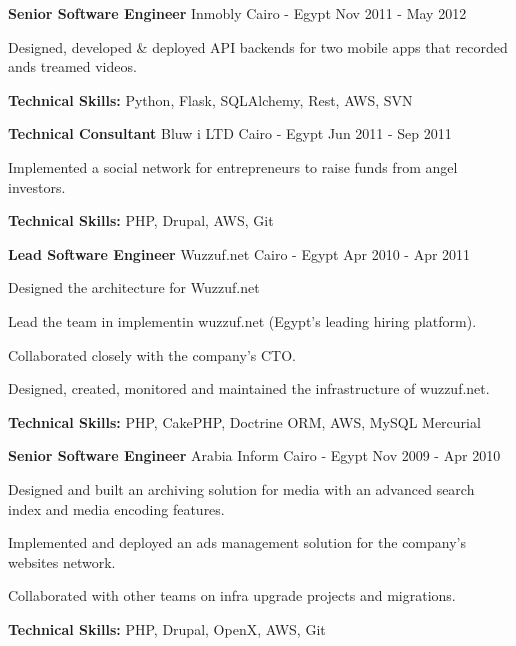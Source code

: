 \begin{cventries}
  \cventry
    {\textbf{Senior Software Engineer}} %
    {Inmobly} %
    {Cairo - Egypt} %
    {Nov 2011 - May 2012} %
    {
      \begin{cvitems} %
        \item {Designed, developed \& deployed API backends for two mobile apps that recorded ands
          treamed videos.}
        \item {\textbf{Technical Skills:} Python, Flask, SQLAlchemy, Rest, AWS, SVN}
      \end{cvitems}
    }

  \cventry
    {\textbf{Technical Consultant}} %
    {Bluw i LTD} %
    {Cairo - Egypt} %
    {Jun 2011 - Sep 2011} %
    {
      \begin{cvitems} %
        \item {Implemented a social network for entrepreneurs to raise funds from angel investors.}
        \item {\textbf{Technical Skills:} PHP, Drupal, AWS, Git}
      \end{cvitems}
    }

  \cventry
    {\textbf{Lead Software Engineer}} %
    {Wuzzuf.net} %
    {Cairo - Egypt} %
    {Apr 2010 - Apr 2011} %
    {
      \begin{cvitems} %
        \item {Designed the architecture for Wuzzuf.net}
        \item {Lead the team in implementin wuzzuf.net (Egypt’s leading hiring platform).}
        \item {Collaborated closely with the company’s CTO.}
        \item {Designed, created, monitored and maintained the infrastructure of wuzzuf.net.}
        \item {\textbf{Technical Skills:} PHP, CakePHP, Doctrine ORM, AWS, MySQL Mercurial}
      \end{cvitems}
    }

  \cventry
    {\textbf{Senior Software Engineer}} %
    {Arabia Inform} %
    {Cairo - Egypt} %
    {Nov 2009 - Apr 2010} %
    {
      \begin{cvitems} %
        \item {Designed and built an archiving solution for media with an advanced search index and
          media encoding features.}
        \item {Implemented and deployed an ads management solution for the company’s websites
          network.}
        \item {Collaborated with other teams on infra upgrade projects and migrations.}
        \item {\textbf{Technical Skills:} PHP, Drupal, OpenX, AWS, Git}
      \end{cvitems}
    }


\end{cventries}
